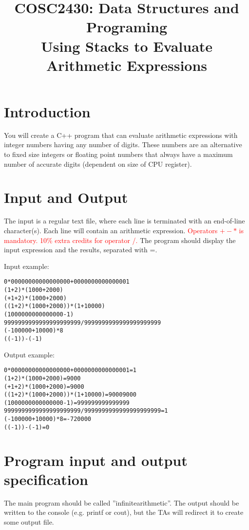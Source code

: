 
\title{COSC2430: Data Structures and Programing\\
Using Stacks to Evaluate Arithmetic Expressions
}

\date{}



\pagestyle{plain}
\let\thepage\relax  %

\maketitle

\section{Introduction}
You will create a C++ program that can evaluate arithmetic expressions with integer numbers having any
number of digits. These numbers are an alternative to fixed size integers or floating point numbers that
always have a maximum number of accurate digits (dependent on size of CPU register).
\section{Input and Output}

The input is a regular text file, where each line is terminated with an end-of-line character(s). Each line will
contain an arithmetic expression. \textcolor{red}{Operators $+ - *$ is mandatory. 10\% extra credits for operator /.} The program should display the input expression and the results, separated
with =.

Input example:
\begin{verbatim}
0*00000000000000000+0000000000000001
(1+2)*(1000+2000)
(+1+2)*(1000+2000)
((1+2)*(1000+2000))*(1+10000)
(1000000000000000-1)
9999999999999999999999/9999999999999999999999
(-100000+10000)*8
((-1))-(-1)
\end{verbatim}
Output example:
\begin{verbatim}
0*00000000000000000+0000000000000001=1
(1+2)*(1000+2000)=9000
(+1+2)*(1000+2000)=9000
((1+2)*(1000+2000))*(1+10000)=90009000
(1000000000000000-1)=999999999999999
9999999999999999999999/9999999999999999999999=1
(-100000+10000)*8=-720000
((-1))-(-1)=0
\end{verbatim}

\section{Program input and output specification}
The main program should be called ”infinitearithmetic”. The output should be written to the console (e.g.
printf or cout), but the TAs will redirect it to create some output file.

